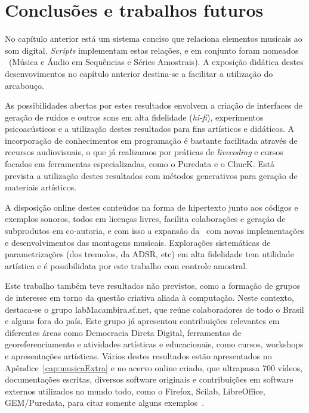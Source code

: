 \chapter{Conclusões e trabalhos futuros} %
\label{cap:conclusao}

No capítulo anterior está um sistema conciso
que relaciona elementos musicais ao som digital. \emph{Scripts} 
implementam estas relações, e em conjunto foram nomeados \massa\ (Música
e Áudio em Sequências e Séries Amostrais). 
A exposição didática destes desenvovimentos no
capítulo anterior destina-se a facilitar a utilização
do arcabouço.

As possibilidades abertas por estes resultados envolvem a criação de interfaces de geração de ruídos e outros sons em alta fidelidade (\emph{hi-fi}), experimentos psicoacústicos e a utilização destes resultados para fins artísticos e didáticos. A incorporação de conhecimentos
em programação é bastante facilitada através de recursos audiovisuais, o que já realizamos por práticas de \emph{livecoding} e cursos focados em ferramentas especializadas, como o Puredata e o ChucK.
Está prevista a utilização destes resultados com
métodos generativos para geração de materiais artísticos.

A disposição online destes conteúdos na forma de hipertexto junto aos códigos e exemplos sonoros, todos em licenças livres, facilita colaborações e geração de subprodutos em co-autoria, e com isso a expansão da \massa\ com novas implementações e desenvolvimentos das montagens musicais.
Explorações sistemáticas de parametrizações (dos tremolos, da ADSR, etc) em alta fidelidade tem utilidade artística e é possibilidata por este trabalho com controle amostral. 

Este trabalho também teve resultados não previstos, como a formação de grupos
de interesse em torno da questão criativa aliada à computação.
Neste contexto, destaca-se o grupo
labMacambira.sf.net, que reúne colaboradores de todo o Brasil e alguns fora do país.
Este grupo
já apresentou contribuições relevantes em diferentes áreas
como Democracia Direta Digital, ferramentas de georeferenciamento e
atividades artísticas e educacionais, como cursos, workshops e apresentações artísticas. Vários destes resultados estão apresentados no Apêndice~\ref{cap:musicaExtra} e no acervo online criado, que ultrapassa 700 vídeos, documentações escritas, diversos software originais e contribuições em software externos utilizados no mundo todo, como o Firefox, Scilab, LibreOffice, GEM/Puredata, para citar somente alguns exemplos~\cite{siteLM,wikiLM,vimeoLM}.

